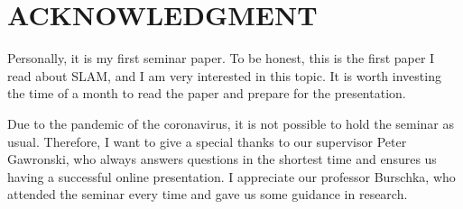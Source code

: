 \documentclass[letterpaper, 10 pt, conference]{ieeeconf}  %
\begin{document}
\section*{ACKNOWLEDGMENT}
Personally, it is my first seminar paper. To be honest, this is the first paper I read about SLAM, and I am very interested in this topic. It is worth investing the time of a month to read the paper and prepare for the presentation. 

Due to the pandemic of the coronavirus, it is not possible to hold the seminar as usual. Therefore, I want to give a special thanks to our supervisor Peter Gawronski, who always answers questions in the shortest time and ensures us having a successful online presentation. I appreciate our professor Burschka, who attended the seminar every time and gave us some guidance in research.

\printbibliography
\end{document}
